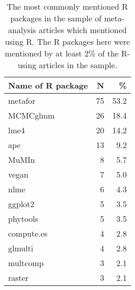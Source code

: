 \begin{table}[ht]
\centering
\begin{tabular}{lrr}
  \hline
Name of R package & N & \% \\ 
  \hline
metafor & 75 & 53.2 \\ 
  MCMCglmm & 26 & 18.4 \\ 
  lme4 & 20 & 14.2 \\ 
  ape & 13 & 9.2 \\ 
  MuMIn & 8 & 5.7 \\ 
  vegan & 7 & 5.0 \\ 
  nlme & 6 & 4.3 \\ 
  ggplot2 & 5 & 3.5 \\ 
  phytools & 5 & 3.5 \\ 
  compute.es & 4 & 2.8 \\ 
  glmulti & 4 & 2.8 \\ 
  multcomp & 3 & 2.1 \\ 
  raster & 3 & 2.1 \\ 
   \hline
\end{tabular}
\caption{The most commonly mentioned R packages in the sample of meta-analysis articles which mentioned using R. The R packages here were mentioned by at least 2\% of the R-using articles in the sample.} 
\label{tab:ma_res_top_rpkg_mentions}
\end{table}

